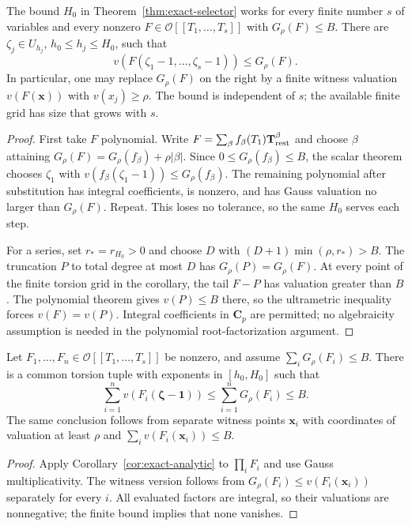 \begin{corollary}\label{cor:exact-analytic}
The bound $H_0$ in Theorem~\ref{thm:exact-selector} works for every
finite number $s$ of variables and every nonzero
$F\in\mathcal O[[T_1,\ldots,T_s]]$ with $G_\rho(F)\leq B$.
There are $\zeta_j\in U_{h_j}$, $h_0\leq h_j\leq H_0$, such that
\[
 v(F(\zeta_1-1,\ldots,\zeta_s-1))\leq G_\rho(F).
\]
In particular, one may replace $G_\rho(F)$ on the right by a finite
witness valuation $v(F(\mathbf x))$ with $v(x_j)\geq\rho$.
The bound is independent of $s$; the available finite grid has size
that grows with $s$.
\end{corollary}
\begin{proof}
First take $F$ polynomial.  Write
$F=\sum_\beta f_\beta(T_1)\mathbf T_{\rm rest}^\beta$ and choose
$\beta$ attaining
$G_\rho(F)=G_\rho(f_\beta)+\rho|\beta|$.
Since $0\leq G_\rho(f_\beta)\leq B$, the scalar theorem chooses
$\zeta_1$ with
$v(f_\beta(\zeta_1-1))\leq G_\rho(f_\beta)$.
The remaining polynomial after substitution has integral coefficients,
is nonzero, and has Gauss valuation no larger than $G_\rho(F)$.
Repeat.  This loses no tolerance, so the same $H_0$ serves each step.

For a series, set $r_*=r_{H_0}>0$ and choose $D$ with
$(D+1)\min(\rho,r_*)>B$.  The truncation $P$ to total degree at most
$D$ has $G_\rho(P)=G_\rho(F)$.  At every point of the finite torsion
grid in the corollary, the tail $F-P$ has valuation greater than $B$.
The polynomial theorem gives $v(P)\leq B$ there, so the ultrametric
inequality forces $v(F)=v(P)$.  Integral coefficients in $\mathbf C_p$
are permitted; no algebraicity assumption is needed in the polynomial
root-factorization argument.
\end{proof}

\begin{corollary}\label{cor:aggregate}
Let $F_1,\ldots,F_n\in\mathcal O[[T_1,\ldots,T_s]]$ be nonzero,
and assume $\sum_iG_\rho(F_i)\leq B$.
There is a common torsion tuple with exponents in $[h_0,H_0]$ such
that
\[
        \sum_{i=1}^n v(F_i(\boldsymbol\zeta-\mathbf1))
        \leq\sum_{i=1}^nG_\rho(F_i)\leq B.
\]
The same conclusion follows from separate witness points
$\mathbf x_i$ with coordinates of valuation at least $\rho$ and
$\sum_i v(F_i(\mathbf x_i))\leq B$.
\end{corollary}
\begin{proof}
Apply Corollary~\ref{cor:exact-analytic} to $\prod_iF_i$ and use
Gauss multiplicativity.  The witness version follows from
$G_\rho(F_i)\leq v(F_i(\mathbf x_i))$ separately for every $i$.
All evaluated factors are integral, so their valuations are nonnegative;
the finite bound implies that none vanishes.
\end{proof}


